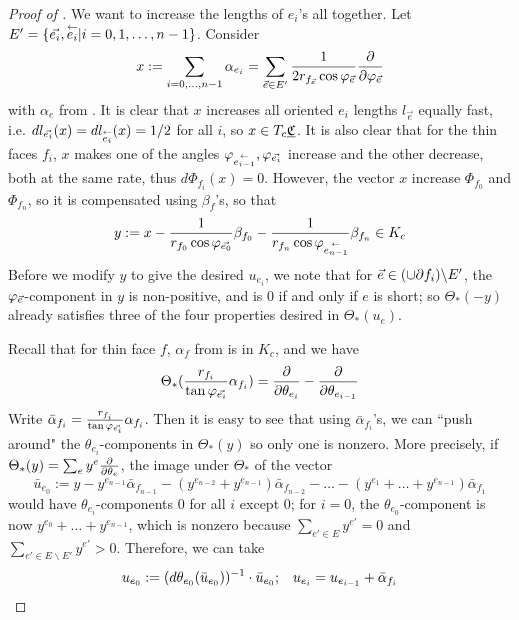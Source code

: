 \begin{proof}[Proof of ]
We want to increase the lengths of $e_i$'s all together.
Let $E' = \{\vec{e_i}, \overset{\leftarrow}{e_i} | i=0,1,\ldots,n-1\}$.
Consider
\[
x :=
\sum_{i=0,\ldots,n-1} \alpha_{e_i}
=
\sum_{\vec{e} \in E'}
\frac{1}{2 r_{f_{\vec{e}}} \cos \varphi_{\vec{e}}} {\frac{\partial}{\partial \varphi_{\vec{e}}}}
\]
with $\alpha_e$ from .
It is clear that $x$ increases all oriented $e_i$ lengths
$l_{\vec{e}}$ equally fast,
i.e. $dl_{\vec{e_i}}(x) = dl_{\overset{\leftarrow}{e_i}}(x) = 1/2$ for all $i$,
so $x\in T_c {\underline{\mathfrak{C}}}$.
It is also clear that for the thin faces $f_i$,
$x$ makes one of the angles $\varphi_{\overset{\leftarrow}{e_{i-1}}}, \varphi_{\vec{e_i}}$
increase and the other decrease, both at the same rate,
thus $d\Phi_{f_i}(x) = 0$.
However, the vector $x$ increase $\Phi_{f_0}$ and $\Phi_{f_n}$,
so it is compensated using $\beta_f$'s, so that
\[
y := x - \frac{1}{r_{f_0} \cos \varphi_{\vec{e_0}}} \beta_{f_0}
- \frac{1}{r_{f_n} \cos \varphi_{\overset{\leftarrow}{e_{n-1}}}} \beta_{f_n}
\in K_c
\]
Before we modify $y$ to give the desired $u_{e_i}$,
we note that for $\vec{e} \in (\cup \partial f_i) \backslash E'$,
the $\varphi_{\vec{e}}$-component in $y$ is non-positive,
and is 0 if and only if $e$ is short;
so $\Theta_*(-y)$ already satisfies three of the four properties
desired in $\Theta_*(u_e)$.


Recall that for thin face $f$,
$\alpha_f$ from  is in $K_c$,
and we have
\[
\Theta_*(\frac{r_{f_i}}{\tan \varphi_{\vec{e_i}}} \alpha_{f_i}) = 
	{\frac{\partial}{\partial \theta_{e_i}}} - {\frac{\partial}{\partial \theta_{e_{i-1}}}}
\]
Write $\bar{\alpha}_{f_i} = \frac{r_{f_i}}{\tan \varphi_{\vec{e_i}}} \alpha_{f_i}$.
Then it is easy to see that using $\bar{\alpha}_{f_i}$'s, we can
``push around" the $\theta_{e_i}$-components in $\Theta_*(y)$
so only one is nonzero.
More precisely, if
$\Theta_*(y) = \sum_e y^e {\frac{\partial}{\partial \theta_e}}$, the image under $\Theta_*$
of the vector
\[
\bar{u}_{e_0} := y - y^{e_{n-1}} \bar{\alpha}_{f_{n-1}}
- (y^{e_{n-2}} + y^{e_{n-1}}) \bar{\alpha}_{f_{n-2}}
- \ldots
- (y^{e_1} + \ldots + y^{e_{n-1}}) \bar{\alpha}_{f_1}
\]
would have $\theta_{e_i}$-components 0 for all $i$ except 0;
for $i=0$, the $\theta_{e_0}$-component is now $y^{e_0} + \ldots + y^{e_{n-1}}$,
which is nonzero because $\sum_{e'\in E} y^{e'} = 0$
and $\sum_{e' \in E \backslash E'} y^{e'} > 0$.
Therefore, we can take
\[
u_{e_0} := (d\theta_{e_0}(\bar{u}_{e_0}))^{-1} \cdot \bar{u}_{e_0};
\;\;\;
u_{e_i} = u_{e_{i-1}} + \bar{\alpha}_{f_i}
\]


\end{proof}
